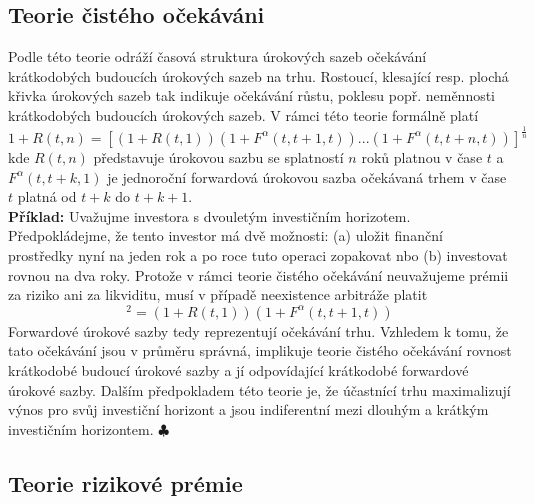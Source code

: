 \documentclass[a4paper]{book}
\begin{document}
\subsection{Teorie čistého očekáváni}

Podle této teorie odráží časová struktura úrokových sazeb očekávání krátkodobých budoucích úrokových sazeb na trhu. Rostoucí, klesající resp. plochá křivka úrokových sazeb tak indikuje očekávání růstu, poklesu popř. neměnnosti krátkodobých budoucích úrokových sazeb. V rámci této teorie formálně platí
\begin{equation*}
1 + R(t, n) = [(1 + R(t,1))(1 + F^{\alpha}(t, t+1,t))  ... (1 + F^{\alpha}(t, t+n,t))]^{\frac{1}{n}}
\end{equation*}
kde $R(t,n)$ představuje úrokovou sazbu se splatností $n$ roků platnou v čase $t$ a $F^{\alpha}(t, t + k, 1)$ je jednoroční forwardová úrokovou sazba očekávaná trhem v čase $t$ platná od $t + k$ do $t + k +1$.\\

\noindent \textbf{Příklad:} Uvažujme investora s dvouletým investičním horizotem. Předpokládejme, že tento investor má dvě možnosti: (a) uložit finanční prostředky nyní na jeden rok a po roce tuto operaci zopakovat nbo (b) investovat rovnou na dva roky. Protože v rámci teorie čistého očekávání neuvažujeme prémii za riziko ani za likviditu, musí v případě neexistence arbitráže platit
\begin{equation*}
[1 + R(t, 2)]^2 = (1 + R(t,1))(1 + F^{\alpha}(t, t+1,t))
\end{equation*}
Forwardové úrokové sazby tedy reprezentují očekávání trhu. Vzhledem k tomu, že tato očekávání jsou v průměru správná, implikuje teorie čistého očekávání rovnost krátkodobé budoucí úrokové sazby a jí odpovídající krátkodobé forwardové úrokové sazby. Dalším předpokladem této teorie je, že účastnící trhu maximalizují výnos pro svůj investiční horizont a jsou indiferentní mezi dlouhým a krátkým investičním horizontem. $\clubsuit$

\subsection{Teorie rizikové prémie}
\end{document}

